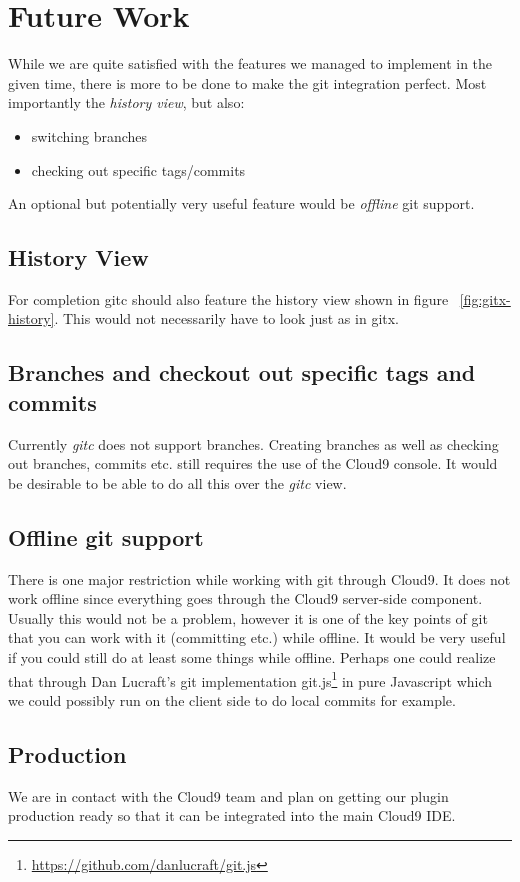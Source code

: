 \section{Future Work}
\label{sec:Future_Work}

While we are quite satisfied with the features we managed to implement in the given time,
there is more to be done to make the git integration perfect.
Most importantly the \emph{history view}, but also:
\begin{itemize}
	\item switching branches
	\item checking out specific tags/commits
\end{itemize}
An optional but potentially very useful feature would be \emph{offline} git support.

\subsection{History View}
\label{sec:history-view}

For completion gitc should also feature the history view shown in figure ~\ref{fig:gitx-history}.
This would not necessarily have to look just as in gitx.

\subsection{Branches and checkout out specific tags and commits}
\label{sec:branches}

Currently \emph{gitc} does not support branches. Creating branches as well as checking out branches,
commits etc. still requires the use of the Cloud9 console. It would be desirable to be able to do all
this over the \emph{gitc} view.

\subsection{Offline git support}
\label{sec:offline-git-support}

There is one major restriction while working with git through Cloud9. It does not work offline since everything goes through the Cloud9 server-side component.
Usually this would not be a problem, however it is one of the key points of git that you can work with it (committing etc.)
while offline.
It would be very useful if you could still do at least some things while offline.
Perhaps one could realize that through Dan Lucraft's git implementation git.js\footnote{\url{https://github.com/danlucraft/git.js}} in pure Javascript which we could possibly run on the client side to do local commits for example.

\subsection{Production}
We are in contact with the Cloud9 team and plan on getting our plugin production ready so that it can be integrated into the main Cloud9 IDE.